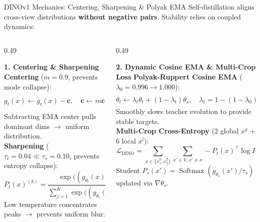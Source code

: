 \documentclass[aspectratio=169,10pt]{beamer}
\begin{document}
\begin{frame}{DINOv1 Mechanics: Centering, Sharpening \& Polyak EMA}
\vspace{-0.5em}
Self-distillation aligns cross-view distributions \textbf{without negative pairs}. Stability relies on coupled dynamics:

\vspace{0.1em}
\begin{columns}[t]
    \begin{column}{0.49\textwidth}
        \begin{block}{\textbf{1. Centering \& Sharpening}}
            \scriptsize
            \textbf{Centering} ($m=0.9$, prevents mode collapse):
            \[
                g_t(x) \leftarrow g_t(x) - \mathbf{c}, \quad \mathbf{c} \leftarrow m \mathbf{c} + (1 - m) \frac{1}{B} \sum_{i=1}^B g_{\theta_t}(x_i)
            \]
            \vspace{-0.5em}
            Subtracting EMA center pulls dominant dims $\to$ uniform distribution.\\[3pt]
            \textbf{Sharpening} ($\tau_t = 0.04 \ll \tau_s = 0.10$, prevents entropy collapse):
            \[
                P_t(x)^{(k)} = \frac{\exp\big((g_{\theta_t}(x)^{(k)} - c^{(k)}) / \tau_t\big)}{\sum_{j=1}^K \exp\big((g_{\theta_t}(x)^{(j)} - c^{(j)}) / \tau_t\big)}
            \]
            \vspace{-0.5em}
            Low temperature concentrates peaks $\to$ prevents uniform blur.
        \end{block}
    \end{column}

    \begin{column}{0.49\textwidth}
        \begin{block}{\textbf{2. Dynamic Cosine EMA \& Multi-Crop Loss}}
            \scriptsize
            \textbf{Polyak-Ruppert Cosine EMA} ($\lambda_0 = 0.996 \to 1.000$):
            \[
                \theta_t \leftarrow \lambda_t \theta_t + (1 - \lambda_t) \theta_s, \quad \lambda_t = 1 - (1 - \lambda_0)\frac{\cos(\pi t / T) + 1}{2}
            \]
            \vspace{-0.5em}
            Smoothly slows teacher evolution to provide stable targets.\\[3pt]
            \textbf{Multi-Crop Cross-Entropy} (2 global $x^g$ + 6 local $x^l$):
            \[
                \mathcal{L}_{\text{DINO}} = \sum_{x \in \{x_1^g, x_2^g\}} \sum_{x' \in V, x' \neq x} - P_t(x)^\top \log P_s(x')
            \]
            \vspace{-0.5em}
            Student $P_s(x') = \operatorname{Softmax}(g_{\theta_s}(x') / \tau_s)$ updated via $\nabla \theta_s$.
        \end{block}
    \end{column}
\end{columns}
\end{frame}
\end{document}
